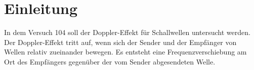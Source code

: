 \section{Einleitung}
\label{sec:Einleitung}
In dem Versuch 104 soll der Doppler-Effekt für Schallwellen untersucht werden.
Der Doppler-Effekt tritt auf, wenn sich der Sender und der Empfänger von Wellen
relativ zueinander bewegen.
Es entsteht eine Frequenzverschiebung am Ort des Empfängers gegenüber der vom Sender
abgesendeten Welle.
